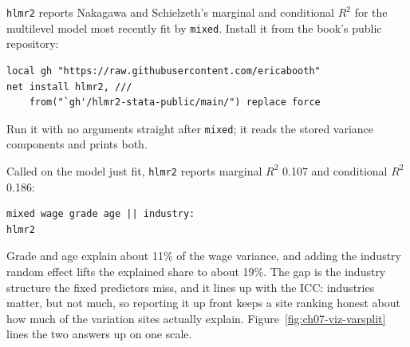 \documentclass[
    a4paper,
    fontsize=10pt,
    twoside=true,
    numbers=noenddot,
]{kaobook}
\begin{document}
\begin{kaobox}[frametitle=Package Integration: \texttt{hlmr2}]
\texttt{hlmr2} reports Nakagawa and Schielzeth's marginal and conditional $R^2$ for the multilevel model most recently fit by \texttt{mixed}. Install it from the book's public repository:
\par
{\footnotesize
\begin{verbatim}
local gh "https://raw.githubusercontent.com/ericabooth"
net install hlmr2, ///
    from("`gh'/hlmr2-stata-public/main/") replace force
\end{verbatim}
}
Run it with no arguments straight after \texttt{mixed}; it reads the stored variance components and prints both.
\end{kaobox}

Called on the model just fit, \texttt{hlmr2} reports marginal $R^2$ 0.107 and conditional $R^2$ 0.186:
\par
{\footnotesize
\begin{verbatim}
mixed wage grade age || industry:
hlmr2
\end{verbatim}
}
Grade and age explain about 11\% of the wage variance, and adding the industry random effect lifts the explained share to about 19\%. The gap is the industry structure the fixed predictors miss, and it lines up with the ICC: industries matter, but not much, so reporting it up front keeps a site ranking honest about how much of the variation sites actually explain. Figure~\ref{fig:ch07-viz-varsplit} lines the two answers up on one scale.
\end{document}
